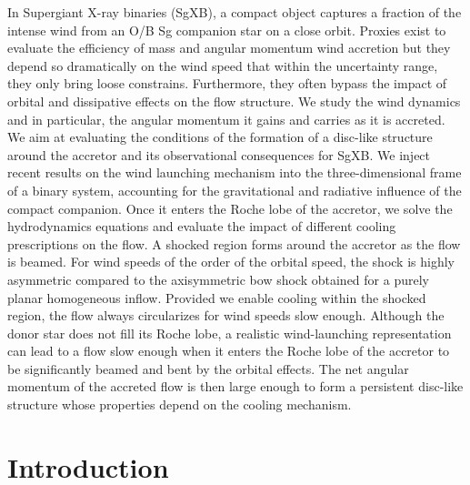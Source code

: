\documentclass{aa}
\newcommand{\sgx}{SgXB\xspace}
\begin{document}
  \abstract
   {In Supergiant X-ray binaries (\sgx), a compact object captures a fraction of the intense wind from an O/B Sg companion star on a close orbit. Proxies exist to evaluate the efficiency of mass and angular momentum wind accretion but they depend so dramatically on the wind speed that within the uncertainty range, they only bring loose constrains. Furthermore, they often bypass the impact of orbital and dissipative effects on the flow structure.
}
   {We study the wind dynamics and in particular, the angular momentum it gains and carries as it is accreted. We aim at evaluating the conditions of the formation of a disc-like structure around the accretor and its observational consequences for \sgx. 
}
   {We inject recent results on the wind launching mechanism into the three-dimensional frame of a binary system, accounting for the gravitational and radiative influence of the compact companion. Once it enters the Roche lobe of the accretor, we solve the hydrodynamics equations and evaluate the impact of different cooling prescriptions on the flow.}
   {A shocked region forms around the accretor as the flow is beamed. For wind speeds of the order of the orbital speed, the shock is highly asymmetric compared to the axisymmetric bow shock obtained for a purely planar homogeneous inflow. Provided we enable cooling within the shocked region, the flow always circularizes for wind speeds slow enough.
}
   {Although the donor star does not fill its Roche lobe, a realistic wind-launching representation can lead to a flow slow enough when it enters the Roche lobe of the accretor to be significantly beamed and bent by the orbital effects. The net angular momentum of the accreted flow is then large enough to form a persistent disc-like structure whose properties depend on the cooling mechanism.
}


   \maketitle
%

\section{Introduction}
\end{document}
